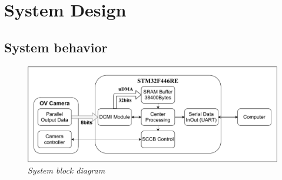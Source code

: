 \documentclass[D:/Latex/Internship/Report/Latex/Report.tex]{subfiles}
\begin{document}
	\chapter{System Design}
	\label{chap:System Design}
		\section{System behavior}
		\label{sec:HardArch}

		\begin{figure}[!ht]
			\label{fig:SystemBlock}
			\centering
			\includegraphics[scale = 0.7]{ControlFlow.pdf}
			\caption{\it System block diagram}
		\end{figure}
\end{document}
